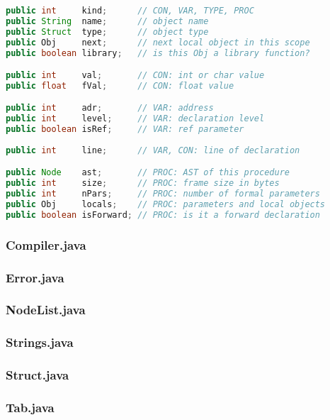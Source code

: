 \begin{lstlisting}[language=Java]
public int     kind;      // CON, VAR, TYPE, PROC
public String  name;      // object name
public Struct  type;      // object type
public Obj     next;      // next local object in this scope
public boolean library;   // is this Obj a library function?

public int     val;       // CON: int or char value
public float   fVal;      // CON: float value

public int     adr;       // VAR: address
public int     level;     // VAR: declaration level
public boolean isRef;     // VAR: ref parameter
	
public int     line;      // VAR, CON: line of declaration

public Node    ast;       // PROC: AST of this procedure
public int     size;      // PROC: frame size in bytes
public int     nPars;     // PROC: number of formal parameters
public Obj     locals;    // PROC: parameters and local objects
public boolean isForward; // PROC: is it a forward declaration
\end{lstlisting}

\subsubsection{Compiler.java}

\subsubsection{Error.java}

\subsubsection{NodeList.java}

\subsubsection{Strings.java}

\subsubsection{Struct.java}

\subsubsection{Tab.java}